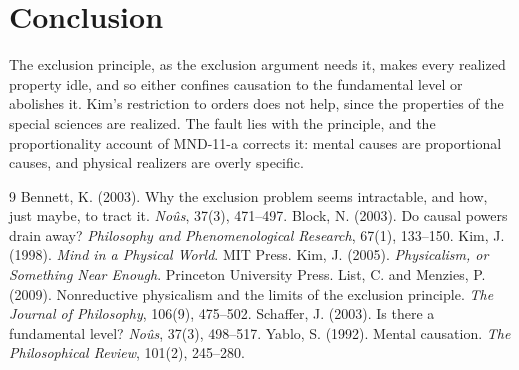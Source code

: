 \documentclass{situationist-preprint}
\begin{document}
\section{Conclusion}

The exclusion principle, as the exclusion argument needs it, makes every realized property idle, and so either confines causation to the fundamental level or abolishes it. Kim's restriction to orders does not help, since the properties of the special sciences are realized. The fault lies with the principle, and the proportionality account of MND-11-a corrects it: mental causes are proportional causes, and physical realizers are overly specific.

\begin{thebibliography}{9}\small
{} Bennett, K. (2003). Why the exclusion problem seems intractable, and how, just maybe, to tract it. \emph{No\^us}, 37(3), 471--497.
 Block, N. (2003). Do causal powers drain away? \emph{Philosophy and Phenomenological Research}, 67(1), 133--150.
 Kim, J. (1998). \emph{Mind in a Physical World}. MIT Press.
 Kim, J. (2005). \emph{Physicalism, or Something Near Enough}. Princeton University Press.
 List, C. and Menzies, P. (2009). Nonreductive physicalism and the limits of the exclusion principle. \emph{The Journal of Philosophy}, 106(9), 475--502.
 Schaffer, J. (2003). Is there a fundamental level? \emph{No\^us}, 37(3), 498--517.
 Yablo, S. (1992). Mental causation. \emph{The Philosophical Review}, 101(2), 245--280.
\end{thebibliography}
\end{document}
